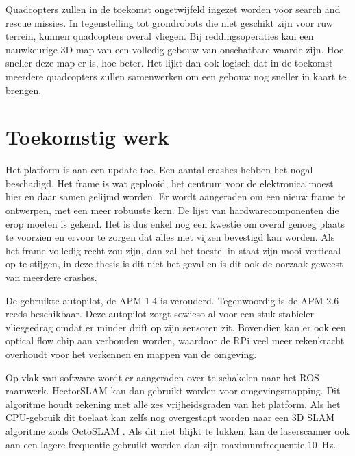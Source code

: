 \npar Quadcopters zullen in de toekomst ongetwijfeld ingezet worden voor search and rescue missies. In tegenstelling tot grondrobots die niet geschikt zijn voor ruw terrein, kunnen quadcopters overal vliegen. Bij reddingsoperaties kan een nauwkeurige 3D map van een volledig gebouw van onschatbare waarde zijn. Hoe sneller deze map er is, hoe beter. Het lijkt dan ook logisch dat in de toekomst meerdere quadcopters zullen samenwerken om een gebouw nog sneller in kaart te brengen.

\section{Toekomstig werk}
Het platform is aan een update toe. Een aantal crashes hebben het nogal beschadigd. Het frame is wat geplooid, het centrum voor de elektronica moest hier en daar samen gelijmd worden. Er wordt aangeraden om een nieuw frame te ontwerpen, met een meer robuuste kern. De lijst van hardwarecomponenten die erop moeten is gekend. Het is dus enkel nog een kwestie om overal genoeg plaats te voorzien en ervoor te zorgen dat alles met vijzen bevestigd kan worden. Als het frame volledig recht zou zijn, dan zal het toestel in staat zijn mooi verticaal op te stijgen, in deze thesis is dit niet het geval en is dit ook de oorzaak geweest van meerdere crashes.

\npar De gebruikte autopilot, de APM 1.4 is verouderd. Tegenwoordig is de APM 2.6 reeds beschikbaar. Deze autopilot zorgt sowieso al voor een stuk stabieler vlieggedrag omdat er minder drift op zijn sensoren zit. Bovendien kan er ook een optical flow chip aan verbonden worden, waardoor de RPi veel meer rekenkracht overhoudt voor het verkennen en mappen van de omgeving.

\npar Op vlak van software wordt er aangeraden over te schakelen naar het ROS raamwerk. {HectorSLAM} kan dan gebruikt worden voor omgevingsmapping. Dit algoritme houdt rekening met alle zes vrijheidsgraden van het platform. Als het CPU-gebruik dit toelaat kan zelfs nog overgestapt worden naar een 3D SLAM algoritme zoals {OctoSLAM} \cite{paper:OctoSLAM}. Als dit niet blijkt te lukken, kan de laserscanner ook aan een lagere frequentie gebruikt worden dan zijn maximumfrequentie \SI{10}{\Hz}.